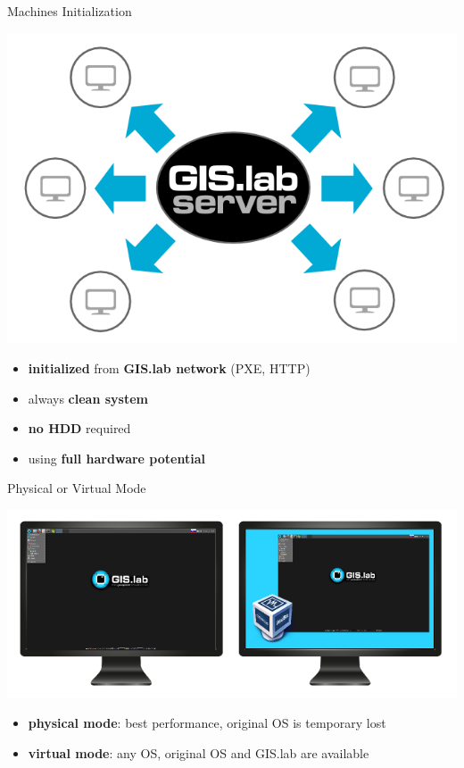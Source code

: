 \documentclass[12pt]{beamer}
\begin{document}
\begin{frame}{Machines Initialization}
	\begin{center}
		\includegraphics[keepaspectratio=true,height=0.4\textheight]{images/gislab-machines-launch.png}
	\end{center}
	\begin{itemize}
		\item \textbf{initialized} from \textbf{GIS.lab network} (PXE, HTTP)
		\item always \textbf{clean system}
		\item \textbf{no HDD} required
		\item using \textbf{full hardware potential}
	\end{itemize}
\end{frame}

\begin{frame}{Physical or Virtual Mode}
	\begin{center}
		\includegraphics[keepaspectratio=true,height=0.5\textheight]{images/physical-or-virtual-mode.png}
	\end{center}
	\begin{itemize}
		\item \textbf{physical mode}: best performance, original OS is temporary lost
		\item \textbf{virtual mode}: any OS, original OS and GIS.lab are available
	\end{itemize}
\end{frame}
\end{document}
